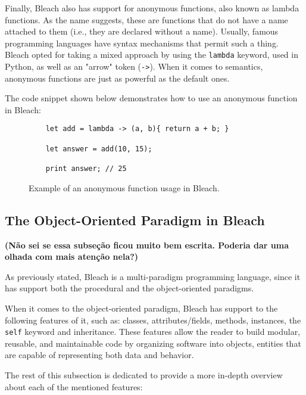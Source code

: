 Finally, Bleach also has support for anonymous functions, also known as lambda functions. As the name suggests, these are functions that do not have a name attached to them (i.e., they are declared without a name). Usually, famous programming languages have syntax mechanisms that permit such a thing. Bleach opted for taking a mixed approach by using the \texttt{lambda} keyword, used in Python, as well as an "arrow" token (\texttt{->}). When it comes to semantics, anonymous functions are just as powerful as the default ones.

The code snippet shown below demonstrates how to use an anonymous function in Bleach:

\begin{figure}[H]
    \centering
    \begin{lstlisting}
    let add = lambda -> (a, b){ return a + b; }
    
    let answer = add(10, 15);
    
    print answer; // 25
    \end{lstlisting}
    \caption{Example of an anonymous function usage in Bleach.}
\end{figure}


\subsection{The Object-Oriented Paradigm in Bleach}
\textbf{(Não sei se essa subseção ficou muito bem escrita. Poderia dar uma olhada com mais atenção nela?)}

As previously stated, Bleach is a multi-paradigm programming language, since it has support both the procedural and the object-oriented paradigms.

When it comes to the object-oriented paradigm, Bleach has support to the following features of it, such as: classes, attributes/fields, methods, instances, the \texttt{self} keyword and inheritance. These features allow the reader to build modular, reusable, and maintainable code by organizing software into objects, entities that are capable of representing both data and behavior.

The rest of this subsection is dedicated to provide a more in-depth overview about each of the mentioned features:

